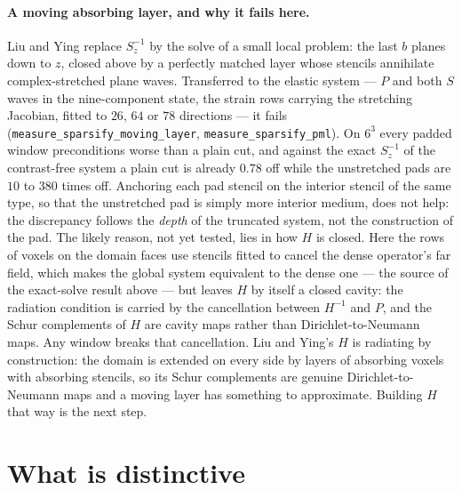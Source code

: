 \documentclass[11pt,a4paper]{article}
\begin{document}
\paragraph{A moving absorbing layer, and why it fails here.} Liu and Ying replace $S_z^{-1}$ by
the solve of a small local problem: the last $b$ planes down to $z$, closed above by a perfectly
matched layer whose stencils annihilate complex-stretched plane waves. Transferred to the elastic
system --- $P$ and both $S$ waves in the nine-component state, the strain rows carrying the
stretching Jacobian, fitted to $26$, $64$ or $78$ directions --- it fails
(\texttt{measure\_sparsify\_moving\_layer}, \texttt{measure\_sparsify\_pml}). On $6^3$ every
padded window preconditions worse than a plain cut, and against the exact $S_z^{-1}$ of the
contrast-free system a plain cut is already $0.78$ off while the unstretched pads are $10$ to
$380$ times off. Anchoring each pad stencil on the interior stencil of the same type, so that
the unstretched pad is simply more interior medium, does not help: the discrepancy follows the
\emph{depth} of the truncated system, not the construction of the pad. The likely reason, not
yet tested, lies in how $H$ is closed. Here the rows of voxels on the domain faces use stencils
fitted to cancel the dense operator's far field, which makes the global system equivalent to
the dense one --- the source of the exact-solve result above --- but leaves $H$ by itself a
closed cavity: the radiation condition is carried by the cancellation between $H^{-1}$ and $P$,
and the Schur complements of $H$ are cavity maps rather than Dirichlet-to-Neumann maps. Any
window breaks that cancellation. Liu and Ying's $H$ is radiating by construction: the domain is
extended on every side by layers of absorbing voxels with absorbing stencils, so its Schur
complements are genuine Dirichlet-to-Neumann maps and a moving layer has something to
approximate. Building $H$ that way is the next step.

\section{What is distinctive}
\end{document}
